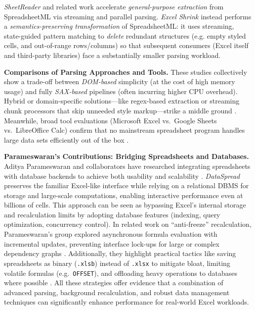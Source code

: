 \documentclass[conference]{IEEEtran}
\begin{document}
\textit{SheetReader} and related work accelerate \emph{general-purpose extraction} from SpreadsheetML via streaming and parallel parsing. \textit{Excel Shrink} instead performs a \emph{semantics-preserving transformation} of SpreadsheetML: it uses streaming, state-guided pattern matching to \emph{delete} redundant structures (e.g. %
empty styled cells, and out-of-range rows/columns) so that subsequent consumers (Excel itself and third-party libraries) face a substantially smaller parsing workload.

\textbf{Comparisons of Parsing Approaches and Tools.}
These studies collectively show a trade-off between \emph{DOM-based} simplicity (at the cost of high memory usage) and fully \emph{SAX-based} pipelines (often incurring higher CPU overhead). Hybrid or domain-specific solutions—like regex-based extraction or streaming chunk processors that skip unneeded style markup—strike a middle ground 
\cite{openxlsx, Henze2022SheetReader}. 
Meanwhile, broad tool evaluations (Microsoft Excel vs.\ Google Sheets vs.\ LibreOffice Calc) confirm that no mainstream spreadsheet program handles large data sets efficiently out of the box 
\cite{Rahman2020Benchmarking}.

\textbf{Parameswaran’s Contributions: Bridging Spreadsheets and Databases.}
Aditya Parameswaran and collaborators have researched integrating spreadsheets with database backends to achieve both usability and scalability 
\cite{Bendre2015DataSpread, Bendre2018PDM}. 
\emph{DataSpread} preserves the familiar Excel-like interface while relying on a relational DBMS for storage and large-scale computations, enabling interactive performance even at billions of cells. This approach can be seen as bypassing Excel’s internal storage and recalculation limits by adopting database features (indexing, query optimization, concurrency control). In related work on “anti-freeze” recalculation, Parameswaran’s group explored asynchronous formula evaluation with incremental updates, preventing interface lock-ups for large or complex dependency graphs 
\cite{Bendre2019AntiFreeze}. 
Additionally, they highlight practical tactics like saving spreadsheets as binary (\texttt{.xlsb}) instead of \texttt{.xlsx} to mitigate bloat, limiting volatile formulas (e.g.\ \texttt{OFFSET}), and offloading heavy operations to databases where possible 
\cite{Mack2018Scalability}. 
All these strategies offer evidence that a combination of advanced parsing, background recalculation, and robust data management techniques can significantly enhance performance for real-world Excel workloads.
\end{document}
